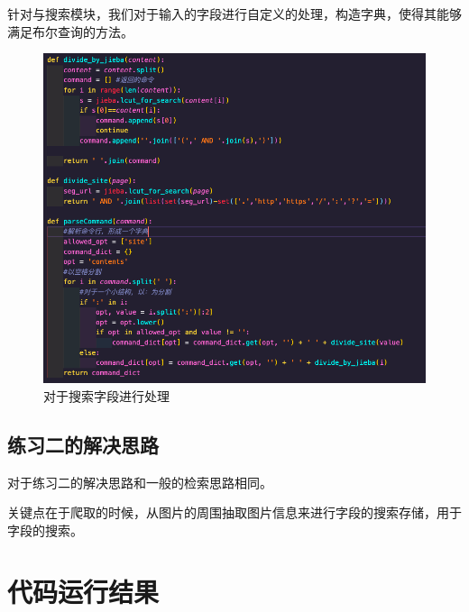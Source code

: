 \documentclass[UTF8]{ctexart}
\begin{document}
            针对与搜索模块，我们对于输入的字段进行自定义的处理，构造字典，使得其能够满足布尔查询的方法。
            \begin{figure}[ht]
                \centering
                \includegraphics[scale=0.2]{img/deal.png}
                \caption{对于搜索字段进行处理}
            \end{figure}

        \subsection{练习二的解决思路}
            对于练习二的解决思路和一般的检索思路相同。

            关键点在于爬取的时候，从图片的周围抽取图片信息来进行字段的搜索存储，用于字段的搜索。

    \section{代码运行结果}
\end{document}
